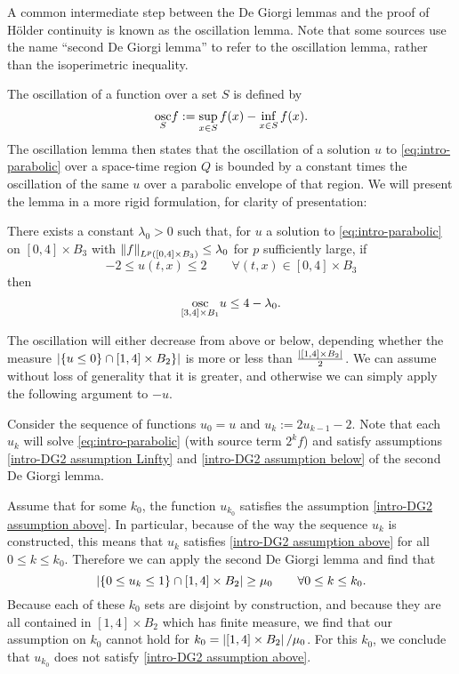 
A common intermediate step between the De Giorgi lemmas and the proof of H\"{o}lder continuity is known as the oscillation lemma.  Note that some sources use the name ``second De Giorgi lemma'' to refer to the oscillation lemma, rather than the isoperimetric inequality.  

The oscillation of a function over a set $S$ is defined by 
\[ \underset{S}{\operatorname{osc}} f := \sup_{x \in S} f(x) - \inf_{x \in S} f(x). \]
The oscillation lemma then states that the oscillation of a solution $u$ to \eqref{eq:intro-parabolic} over a space-time region $Q$ is bounded by a constant times the oscillation of the same $u$ over a parabolic envelope of that region.  We will present the lemma in a more rigid formulation, for clarity of presentation:
\begin{lemma}
There exists a constant $\lambda_0 > 0$ such that, for $u$ a solution to \eqref{eq:intro-parabolic} on $[0,4]\times B_3$ with $\left\lVert f\right\rVert_{L^p([0,4]\times B_3)} \leq \lambda_0$ for $p$ sufficiently large, if
\[ -2 \leq u(t,x) \leq 2 \qquad \forall (t,x) \in [0,4] \times B_3 \]
then 
\[ \underset{[3,4] \times B_1}{\operatorname{osc}} u \leq 4-\lambda_0. \]
\end{lemma}

The oscillation will either decrease from above or below, depending whether the measure $\left\lvert \{u \leq 0\} \cap [1,4]\times B_2\} \right\rvert$ is more or less than $\frac{\left\lvert [1,4]\times B_2 \right\rvert}{2}$.  We can assume without loss of generality that it is greater, and otherwise we can simply apply the following argument to $-u$.  

Consider the sequence of functions $u_0 = u$ and $u_k := 2u_{k-1} - 2$.  Note that each $u_k$ will solve \eqref{eq:intro-parabolic} (with source term $2^k f$) and satisfy assumptions \eqref{intro-DG2 assumption Linfty} and \eqref{intro-DG2 assumption below} of the second De Giorgi lemma.  

Assume that for some $k_0$, the function $u_{k_0}$ satisfies the assumption \eqref{intro-DG2 assumption above}.  In particular, because of the way the sequence $u_k$ is constructed, this means that $u_k$ satisfies \eqref{intro-DG2 assumption above} for all $0 \leq k \leq k_0$.  Therefore we can apply the second De Giorgi lemma and find that 
\[ \left\lvert \{0 \leq u_k \leq 1\} \cap [1,4] \times B_2 \right\rvert \geq \mu_0 \qquad \forall 0 \leq k \leq k_0. \]
Because each of these $k_0$ sets are disjoint by construction, and because they are all contained in $[1,4]\times B_2$ which has finite measure, we find that our assumption on $k_0$ cannot hold for $k_0 = \left\lvert [1,4]\times B_2 \right\rvert / \mu_0$.  For this $k_0$, we conclude that $u_{k_0}$ does not satisfy \eqref{intro-DG2 assumption above}.  

